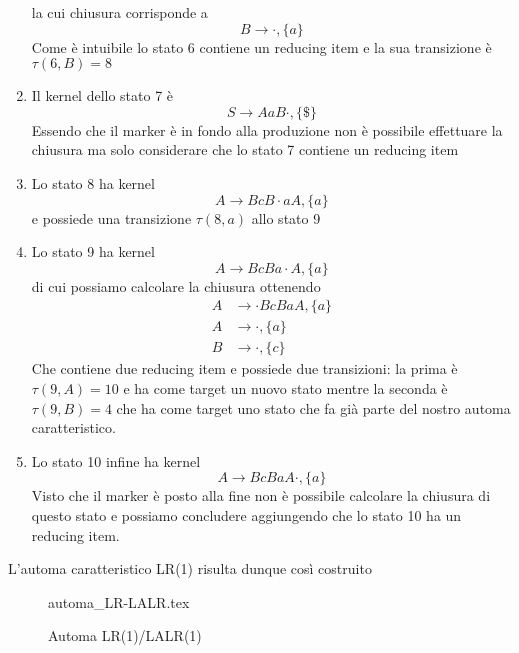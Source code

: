 \documentclass[class=book, crop=false, oneside, 12pt]{standalone}
\begin{document}
\begin{enumerate}
    la cui chiusura corrisponde a 
    \begin{equation*}
         B \to \cdot, \{a\} 
    \end{equation*}
    Come è intuibile lo stato 6 contiene un reducing item e la sua transizione è \(\tau(6, B)=8\)
    \item Il kernel dello stato 7 è 
    \begin{equation*}
         S \to  AaB \cdot, \{\$\}  
    \end{equation*}
    Essendo che il marker è in fondo alla produzione non è possibile effettuare la chiusura ma solo considerare che lo stato 7 contiene un reducing item
    \item Lo stato 8 ha kernel
    \begin{equation*}
        A \to BcB \cdot aA, \{a\} 
    \end{equation*}
    e possiede una transizione \(\tau(8, a)\) allo stato 9
    \item Lo stato 9 ha kernel
    \begin{equation*}
        A \to BcBa \cdot A, \{a\} 
    \end{equation*}
    di cui possiamo calcolare la chiusura ottenendo
    \begin{align*}
        A &\to \cdot BcBaA, \{a\} \\
        A &\to \cdot, \{a\} \\
        B &\to \cdot, \{c\}
    \end{align*}
    Che contiene due reducing item e possiede due transizioni: la prima è \(\tau(9, A)=10\) e ha come target un nuovo stato mentre la seconda è \(\tau(9, B)=4\) che ha come target uno stato che fa già parte del nostro automa caratteristico.
    \item Lo stato 10 infine ha kernel
    \begin{equation*}
        A \to BcBaA \cdot, \{a\} 
    \end{equation*}
    Visto che il marker è posto alla fine non è possibile calcolare la chiusura di questo stato e possiamo concludere aggiungendo che lo stato 10 ha un reducing item. 
\end{enumerate}

L'automa caratteristico LR(1) risulta dunque così costruito

\begin{figure}[H]
	\centering
	{automa_LR-LALR.tex}
    \caption{Automa LR(1)/LALR(1)}
    \label{fig:lalr-automata}
\end{figure}
\end{document}
